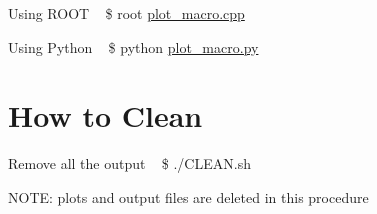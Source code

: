 \begin{DoxyItemize}
\item Using R\+O\+OT ~\newline
 \$ root \hyperlink{plot__macro_8cpp}{plot\+\_\+macro.\+cpp}
\item Using Python ~\newline
 \$ python \hyperlink{plot__macro_8py}{plot\+\_\+macro.\+py}
\end{DoxyItemize}\hypertarget{index_clean}{}\section{How to Clean}\label{index_clean}

\begin{DoxyItemize}
\item Remove all the output ~\newline
 \$ ./\+C\+L\+E\+AN.sh
\item N\+O\+TE\+: plots and output files are deleted in this procedure 
\end{DoxyItemize}